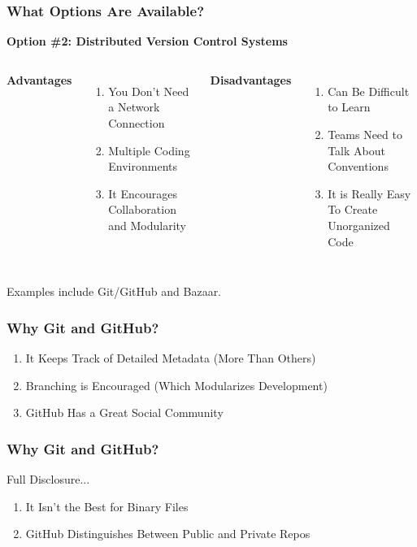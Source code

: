 \begin{frame}
\frametitle{\large{What Options Are Available?}}
\textbf{Option \#2: Distributed Version Control Systems}
\vspace{8mm}
\begin{columns}[c]
\column{2in}
{\small \textbf{Advantages}}
\begin{enumerate}
\small
\item You Don't Need a Network Connection
\item Multiple Coding Environments
\item It Encourages Collaboration and Modularity
\end{enumerate}
\column{2in}
{\small \textbf{Disadvantages}}
\begin{enumerate}
\small
\item Can Be Difficult to Learn
\item Teams Need to Talk About Conventions
\item It is Really Easy To Create Unorganized Code
\end{enumerate}
\end{columns}
\vspace{5mm}
{\small Examples include Git/GitHub and Bazaar.}
\end{frame}

\begin{frame}
\frametitle{\large{Why Git and GitHub?}}
\begin{enumerate}
\item It Keeps Track of Detailed Metadata (More Than Others)
\item Branching is Encouraged (Which Modularizes Development)
\item GitHub Has a Great Social Community
\end{enumerate}
\end{frame}

\begin{frame}
\frametitle{\large{Why Git and GitHub?}}
Full Disclosure...
\begin{enumerate}
\item It Isn't the Best for Binary Files
\item GitHub Distinguishes Between Public and Private Repos
\end{enumerate}
\end{frame}
